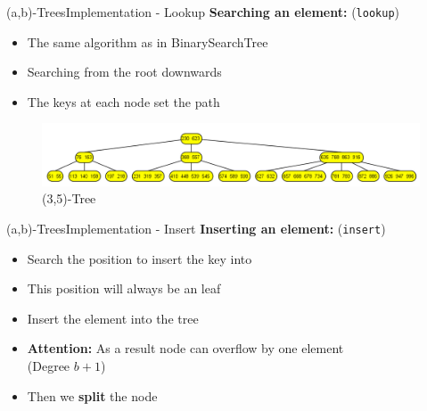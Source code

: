 \begin{frame}{(a,b)-Trees}{Implementation - Lookup}
  \textbf{Searching an element:} (\texttt{\color{MainA}lookup})
  \begin{itemize}
    \item<2->
      The same algorithm as in {\color{MainA}BinarySearchTree}
    \item<3->
      Searching from the root downwards
    \item<4->
      The keys at each node set the path
  \end{itemize}
  \begin{figure}[!h]
    \includegraphics[width=1\textwidth]{Images/(a,b)-Tree/(3,5)-Tree_Search.png}
    \caption{(3,5)-Tree~\cite{gnarley_trees}}
    \label{fig:a_b_tree:a_b_tree_example}
  \end{figure}
\end{frame}


\begin{frame}{(a,b)-Trees}{Implementation - Insert}
  \textbf{Inserting an element:} (\texttt{\color{MainA}insert})
  \begin{itemize}
    \item<2->
      Search the position to insert the key into
    \item<3->
      This position will always be an leaf
    \item<4->
      Insert the element into the tree
    \item<5->
      \textbf{Attention:} As a result node can overflow by one element\\
      (Degree {\color{MainA}$b+1$})
    \item<6-> Then we \textbf{split} the node
  \end{itemize}
\end{frame}


